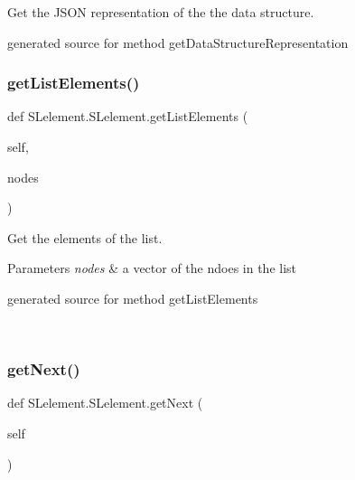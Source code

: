 Get the J\+S\+ON representation of the the data structure. 

\begin{DoxyVerb}generated source for method getDataStructureRepresentation \end{DoxyVerb}
 \hypertarget{class_s_lelement_1_1_s_lelement_ac9d7ae06a680c795138ee3eff910b25f}{}\label{class_s_lelement_1_1_s_lelement_ac9d7ae06a680c795138ee3eff910b25f} 
\subsubsection{\texorpdfstring{get\+List\+Elements()}{getListElements()}}
{\footnotesize\ttfamily def S\+Lelement.\+S\+Lelement.\+get\+List\+Elements (\begin{DoxyParamCaption}\item[{}]{self,  }\item[{}]{nodes }\end{DoxyParamCaption})}



Get the elements of the list. 


\begin{DoxyParams}{Parameters}
{\em nodes} & a vector of the ndoes in the list\begin{DoxyVerb}generated source for method getListElements \end{DoxyVerb}
 \\
\hline
\end{DoxyParams}
\hypertarget{class_s_lelement_1_1_s_lelement_a7fccca213f1f7c743ee91b296d47d748}{}\label{class_s_lelement_1_1_s_lelement_a7fccca213f1f7c743ee91b296d47d748} 
\subsubsection{\texorpdfstring{get\+Next()}{getNext()}}
{\footnotesize\ttfamily def S\+Lelement.\+S\+Lelement.\+get\+Next (\begin{DoxyParamCaption}\item[{}]{self }\end{DoxyParamCaption})}



